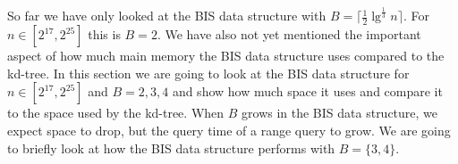 So far we have only looked at the BIS data structure with $B = \lceil \frac{1}{2}\lg^{\frac{1}{3}} n \rceil$. For $n \in [2^{17}, 2^{25}]$ this is $B=2$. We have also not yet mentioned the important aspect of how much main memory the BIS data structure uses compared to the kd-tree. In this section we are going to look at the BIS data structure for $n \in [2^{17}, 2^{25}]$ and $B={2,3,4}$ and show how much space it uses and compare it to the space used by the kd-tree. When $B$ grows in the BIS data structure, we expect space to drop, but the query time of a range query to grow. We are going to briefly look at how the BIS data structure performs with $B=\{3,4\}$. 

\begin{figure}[h]
\end{figure}

